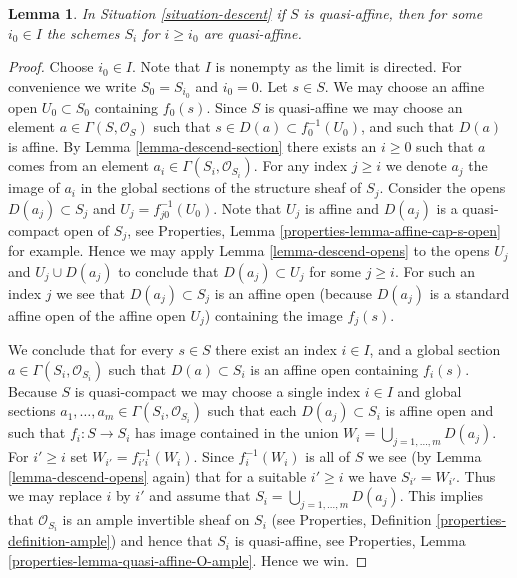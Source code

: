 \documentclass{stacks-project}
\theoremstyle{plain}
\newtheorem{lemma}[subsection]{Lemma}
\theoremstyle{definition}
\theoremstyle{remark}
\numberwithin{equation}{subsection}
\begin{document}
\begin{lemma}
\label{lemma-limit-quasi-affine}
In Situation \ref{situation-descent} if $S$ is quasi-affine, then
for some $i_0 \in I$ the schemes $S_i$ for $i \geq i_0$ are quasi-affine.
\end{lemma}

\begin{proof}
Choose $i_0 \in I$. Note that $I$ is nonempty as the limit is directed.
For convenience we write $S_0 = S_{i_0}$ and $i_0 = 0$.
Let $s \in S$. We may choose an affine open
$U_0 \subset S_0$ containing $f_0(s)$. Since $S$ is quasi-affine
we may choose an element $a \in \Gamma(S, \mathcal{O}_S)$ such
that $s \in D(a) \subset f_0^{-1}(U_0)$, and such that
$D(a)$ is affine. By Lemma \ref{lemma-descend-section}
there exists an $i \geq 0$ such that $a$
comes from an element $a_i \in \Gamma(S_i, \mathcal{O}_{S_i})$.
For any index $j \geq i$ we denote $a_j$
the image of $a_i$ in the global sections of the
structure sheaf of $S_j$.
Consider the opens $D(a_j) \subset S_j$
and $U_j = f_{j0}^{-1}(U_0)$. Note that
$U_j$ is affine and $D(a_j)$ is a quasi-compact open of $S_j$,
see Properties, Lemma \ref{properties-lemma-affine-cap-s-open}
for example. Hence we may apply Lemma \ref{lemma-descend-opens} to the opens
$U_j$ and $U_j \cup D(a_j)$ to conclude that
$D(a_j) \subset U_j$ for some  $j \geq i$.
For such an index $j$ we see that $D(a_j) \subset S_j$ is an affine open
(because $D(a_j)$ is a standard affine open of the affine open $U_j$)
containing the image $f_j(s)$.

\medskip\noindent
We conclude that for every $s \in S$ there exist
an index $i \in I$, and a global section
$a \in \Gamma(S_i, \mathcal{O}_{S_i})$
such that $D(a) \subset S_i$ is an affine open
containing $f_i(s)$. Because $S$ is quasi-compact we
may choose a single index $i \in I$ and global sections
$a_1, \ldots, a_m \in \Gamma(S_i, \mathcal{O}_{S_i})$
such that each $D(a_j) \subset S_i$ is affine open
and such that $f_i : S \to S_i$ has image contained
in the union $W_i = \bigcup_{j = 1, \ldots, m} D(a_j)$.
For $i' \geq i$ set $W_{i'} = f_{i'i}^{-1}(W_i)$.
Since $f_i^{-1}(W_i)$ is all of $S$ we see
(by Lemma \ref{lemma-descend-opens} again)
that for a suitable $i' \geq i$ we
have $S_{i'} = W_{i'}$. Thus we may replace $i$ by
$i'$ and assume that $S_i = \bigcup_{j = 1, \ldots, m} D(a_j)$.
This implies that $\mathcal{O}_{S_i}$ is an ample invertible
sheaf on $S_i$ (see Properties, Definition \ref{properties-definition-ample})
and hence that $S_i$ is quasi-affine, see
Properties, Lemma \ref{properties-lemma-quasi-affine-O-ample}.
Hence we win.
\end{proof}
\end{document}
